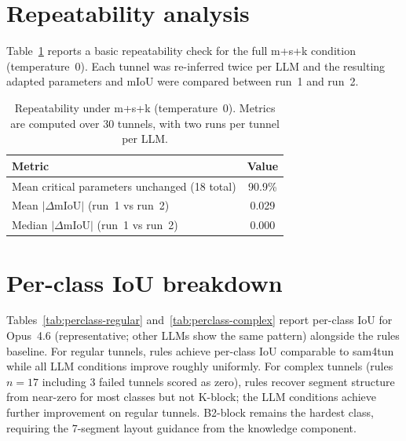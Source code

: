 \section{Repeatability analysis}\label{app:repeatability}
Table~\ref{tab:repeatability} reports a basic repeatability check for the full \mbox{m+s+k} condition (temperature~0). Each tunnel was re-inferred twice per LLM and the resulting adapted parameters and mIoU were compared between run~1 and run~2.

\begin{table}[ht]
\caption{Repeatability under \mbox{m+s+k} (temperature~0). Metrics are computed over 30 tunnels, with two runs per tunnel per LLM.}\label{tab:repeatability}
\begin{tabular*}{\tblwidth}{@{} l c @{}}
\toprule
Metric & Value \\
\midrule
Mean critical parameters unchanged (18 total) & 90.9\% \\
Mean $\lvert\Delta\mathrm{mIoU}\rvert$ (run~1 vs run~2) & 0.029 \\
Median $\lvert\Delta\mathrm{mIoU}\rvert$ (run~1 vs run~2) & 0.000 \\
\bottomrule
\end{tabular*}
\end{table}

\FloatBarrier
\pagebreak[4]

\section{Per-class IoU breakdown}\label{app:perclass}

Tables~\ref{tab:perclass-regular} and~\ref{tab:perclass-complex} report per-class IoU for Opus~4.6 (representative; other LLMs show the same pattern) alongside the rules baseline. For regular tunnels, rules achieve per-class IoU comparable to sam4tun while all LLM conditions improve roughly uniformly. For complex tunnels (rules $n=17$ including 3 failed tunnels scored as zero), rules recover segment structure from near-zero for most classes but not K-block; the LLM conditions achieve further improvement on regular tunnels. B2-block remains the hardest class, requiring the 7-segment layout guidance from the knowledge component.

